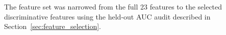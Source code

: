 The feature set was narrowed from the full 23 features to the selected discriminative features using the held-out AUC audit described in Section~\ref{sec:feature_selection}.





